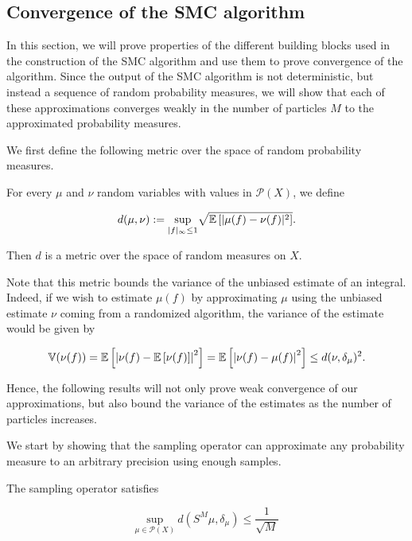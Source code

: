 \subsection{Convergence of the SMC algorithm}

In this section, we will prove properties of the different building blocks used in the construction of the SMC algorithm and use them to prove convergence of the algorithm. Since the output of the SMC algorithm is not deterministic, but instead a sequence of random probability measures, we will show that each of these approximations converges weakly in the number of particles $M$ to the approximated probability measures.

We first define the following metric over the space of random probability measures.

\begin{definition}
  For every $\mu$ and $\nu$ random variables with values in $\mathcal{P}(X)$, we define

  \begin{equation*}
    d(\mu, \nu) := \underset{|f|_\infty\le1}{\text{sup}} \sqrt{\mathbb{E}\left[|\mu(f) - \nu(f)|^2\right]}.
  \end{equation*}

Then $d$ is a metric over the space of random measures on $X$.
\end{definition}

Note that this metric bounds the variance of the unbiased estimate of an integral. Indeed, if we wish to estimate $\mu(f)$ by approximating $\mu$ using the unbiased estimate $\nu$ coming from a randomized algorithm, the variance of the estimate would be given by

\begin{equation*}
  \mathbb{V}(\nu(f)) = \mathbb{E}\left[\left|\nu(f) - \mathbb{E}\left[\nu(f)\right]\right|^2\right] = \mathbb{E}\left[\left|\nu(f) - \mu(f)\right|^2\right] \le d(\nu, \delta_\mu)^2.
\end{equation*}

Hence, the following results will not only prove weak convergence of our approximations, but also bound the variance of the estimates as the number of particles increases.

We start by showing that the sampling operator can approximate any probability measure to an arbitrary precision using enough samples.

\begin{lemma}\label{sampling-bound}
  The sampling operator satisfies

  \begin{equation*}
    \underset{\mu \in \mathcal{P}(X)}{\text{sup}}\ d(S^M\mu, \delta_\mu) \le \frac1{\sqrt{M}}
  \end{equation*}
\end{lemma}

